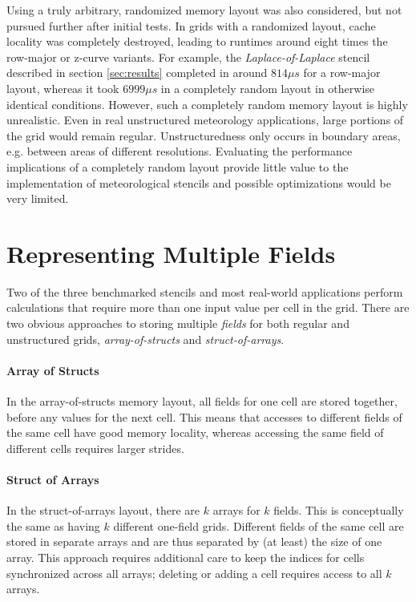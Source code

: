 Using a truly arbitrary, randomized memory layout was also considered, but not pursued further after initial tests. In grids with a randomized layout, cache locality was completely destroyed, leading to runtimes around eight times the row-major or z-curve variants. For example, the \emph{Laplace-of-Laplace} stencil described in section \ref{sec:results} completed in around $814 \mu s$ for a row-major layout, whereas it took $6999 \mu s$ in a completely random layout in otherwise identical conditions. However, such a completely random memory layout is highly unrealistic. Even in real unstructured meteorology applications, large portions of the grid would remain regular. Unstructuredness only occurs in boundary areas, e.g. between areas of different resolutions. Evaluating the performance implications of a completely random layout provide little value to the implementation of meteorological stencils and possible optimizations would be very limited.


\section{Representing Multiple Fields} \label{sec:representing-multiple-fields}

Two of the three benchmarked stencils and most real-world applications perform calculations that require more than one input value per cell in the grid. There are two obvious approaches to storing multiple \emph{fields} for both regular and unstructured grids, \emph{array-of-structs} and \emph{struct-of-arrays}.

\paragraph{Array of Structs}
In the array-of-structs memory layout, all fields for one cell are stored together, before any values for the next cell. This means that accesses to different fields of the same cell have good memory locality, whereas accessing the same field of different cells requires larger strides.

\paragraph{Struct of Arrays}
In the struct-of-arrays layout, there are $k$ arrays for $k$ fields. This is conceptually the same as having $k$ different one-field grids. Different fields of the same cell are stored in separate arrays and are thus separated by (at least) the size of one array. This approach requires additional care to keep the indices for cells synchronized across all arrays; deleting or adding a cell requires access to all $k$ arrays.

